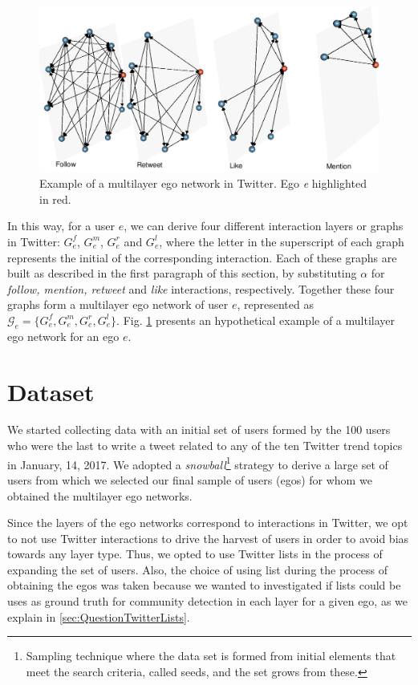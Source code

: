 \begin{figure}[htb]
	\centering
	\includegraphics[width=1\textwidth]{fig/multilayer/layers_oneLine.png}
	\caption{Example of a multilayer ego network in Twitter. Ego {\em e} highlighted in red.}
	\label{fig:ex_multilayer}
\end{figure}
 
In this way, for a user $e$,  we can derive four different interaction layers or graphs in Twitter: $G_e^f$, $G_e^m$, $G_e^r$ and  $G_e^l$, where the letter in the superscript of each graph represents   the initial of the corresponding interaction. Each of these graphs are built as described in the first paragraph of this section, by substituting $\alpha$ for {\em follow, mention, retweet} and {\em like} interactions, respectively. Together these four graphs form a multilayer ego network of user $e$, represented as $\mathcal{G}_e=\{G_e^f, G_e^m, G_e^r, G_e^l \}$. Fig. \ref{fig:ex_multilayer} presents an hypothetical example of a multilayer ego network for an ego $e$. 




\section{Dataset} \label{sec:dataset}

We started collecting data with an initial set of users formed by the 100 users who were the last to write a tweet related to any of the ten Twitter trend topics in January, 14, 2017. We adopted a {\em snowball}\footnote{Sampling technique where the data set is formed from initial elements that meet the search criteria, called seeds, and the set grows from these.} strategy to derive a large set of users from which we selected our final sample of users (egos) for whom we obtained the multilayer ego networks.  

Since the layers of the ego networks correspond to interactions in Twitter, we opt to not use Twitter interactions to drive the harvest of users in order to avoid  bias towards any layer type. Thus, we opted to use Twitter lists in the process of expanding the set of users. Also, the choice of using list during the process of obtaining the egos was taken because we wanted to investigated if lists could be uses as ground truth for community detection in each layer for a given ego, as we explain in \ref{sec:QuestionTwitterLists}. 

